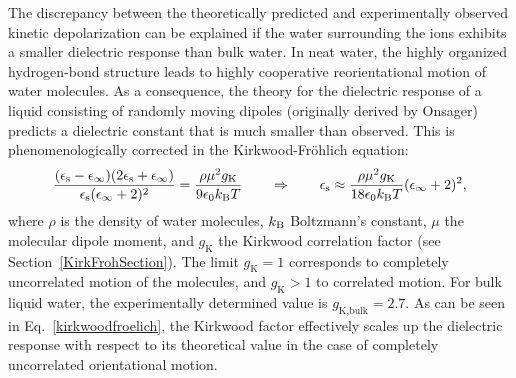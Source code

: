 The discrepancy between the theoretically predicted and experimentally observed kinetic depolarization can be explained if the water surrounding the ions exhibits a smaller dielectric response than bulk water. In neat water, the highly organized hydrogen-bond structure leads to highly cooperative reorientational motion of water molecules. As a consequence, the theory for the dielectric response of a liquid consisting of randomly moving dipoles (originally derived by Onsager\!\cite{Onsager1936a}) predicts a dielectric constant that is much smaller than observed. This is phenomenologically corrected in the Kirkwood-Fr\"ohlich equation:
\begin{equation}
\frac{(\epsilon_{\rm s}-\epsilon_\infty)(2\epsilon_{\rm s}+\epsilon_\infty)}
{\epsilon_{\rm s}(\epsilon_\infty+2)^2}=\frac{\rho \mu^2 g_\text{K}}{9 \epsilon_0 k_{\rm B}T} \qquad
\Rightarrow \qquad
\epsilon_{\rm s} \approx \frac{\rho \mu^2 g_\text{K}}{18 \epsilon_0 k_{\rm B} T}{(\epsilon_\infty + 2)^2},
\label{kirkwoodfroelich}
\end{equation}
where $\rho$ is the density of water molecules, $k_{\rm B}$ Boltzmann's constant, $\mu$ the molecular dipole moment, and $g_\text{K}$ the Kirkwood correlation factor  (see Section~\ref{KirkFrohSection}). The limit $g_\text{K}=1$ corresponds to completely uncorrelated motion of the molecules, and $g_\text{K}>1$ to correlated motion. For bulk liquid water, the experimentally determined value is $g_\text{K,bulk}= 2.7$. As can be seen in Eq.~\ref{kirkwoodfroelich}, the Kirkwood factor effectively scales up the dielectric response with respect to its theoretical value in the case of completely uncorrelated orientational motion.

